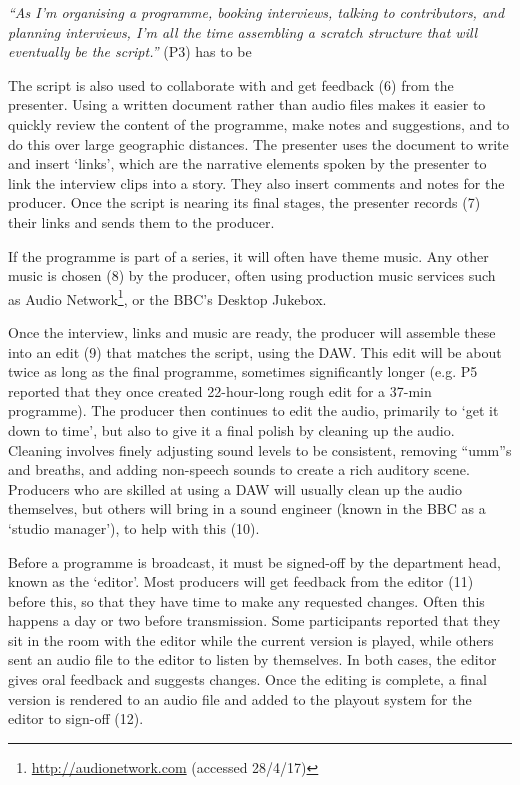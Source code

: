 \textit{``As I'm organising a programme, booking interviews, talking to contributors, and planning interviews, I'm all
the time assembling a scratch structure that will eventually be the script.''} (P3) %
has to be

The script is also used to collaborate with and get feedback (6) from the presenter.  Using a written document rather
than audio files makes it easier to quickly review the content of the programme, make notes and suggestions, and to do
this over large geographic distances. The presenter uses the document to write and insert `links', which are the
narrative elements spoken by the presenter to link the interview clips into a story. They also insert comments and
notes for the producer. Once the script is nearing its final stages, the presenter records (7) their links and sends
them to the producer.

If the programme is part of a series, it will often have theme music. Any other music is chosen (8) by the producer,
often using production music services such as Audio Network\footnote{\url{http://audionetwork.com} (accessed 28/4/17)},
or the BBC's Desktop Jukebox.

Once the interview, links and music are ready, the producer will assemble these into an edit (9) that matches the
script, using the DAW. This edit will be about twice as long as the final programme, sometimes significantly longer
(e.g. P5 reported that they once created 22-hour-long rough edit for a 37-min programme). The producer then continues
to edit the audio, primarily to `get it down to time', but also to give it a final polish by cleaning up the audio.
Cleaning involves finely adjusting sound levels to be consistent, removing ``umm''s and breaths, and adding non-speech
sounds to create a rich auditory scene.  Producers who are skilled at using a DAW will usually clean up the audio
themselves, but others will bring in a sound engineer (known in the BBC as a `studio manager'), to help with this (10).

Before a programme is broadcast, it must be signed-off by the department head, known as the `editor'. Most producers
will get feedback from the editor (11) before this, so that they have time to make any requested changes. Often this
happens a day or two before transmission. Some participants reported that they sit in the room with the editor while
the current version is played, while others sent an audio file to the editor to listen by themselves. In both cases,
the editor gives oral feedback and suggests changes.  Once the editing is complete, a final version is rendered to an
audio file and added to the playout system for the editor to sign-off (12).


